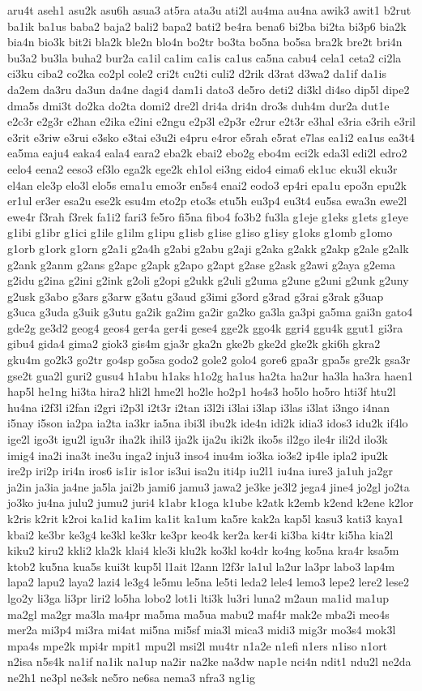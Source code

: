 {aru4t aseh1 asu2k asu6h asua3 at5ra ata3u ati2l au4ma au4na awik3 awit1 b2rut ba1ik ba1us baba2 baja2 bali2 bapa2 bati2 be4ra bena6 bi2ba bi2ta bi3p6 bia2k bia4n bio3k bit2i bla2k ble2n blo4n bo2tr bo3ta bo5na bo5sa bra2k bre2t bri4n bu3a2 bu3la buha2 bur2a ca1il ca1im ca1is ca1us ca5na cabu4 cela1 ceta2 ci2la ci3ku ciba2 co2ka co2pl cole2 cri2t cu2ti culi2 d2rik d3rat d3wa2 da1if da1is da2em da3ru da3un da4ne dagi4 dam1i dato3 de5ro deti2 di3kl di4so dip5l dipe2 dma5s dmi3t do2ka do2ta domi2 dre2l dri4a dri4n dro3s duh4m dur2a dut1e e2c3r e2g3r e2han e2ika e2ini e2ngu e2p3l e2p3r e2rur e2t3r e3hal e3ria e3rih e3ril e3rit e3riw e3rui e3sko e3tai e3u2i e4pru e4ror e5rah e5rat e7las ea1i2 ea1us ea3t4 ea5ma eaju4 eaka4 eala4 eara2 eba2k ebai2 ebo2g ebo4m eci2k eda3l edi2l edro2 eelo4 eena2 eeso3 ef3lo ega2k ege2k eh1ol ei3ng eido4 eima6 ek1uc eku3l eku3r el4an ele3p elo3l elo5s ema1u emo3r en5s4 enai2 eodo3 ep4ri epa1u epo3n epu2k er1ul er3er esa2u ese2k esu4m eto2p eto3s etu5h eu3p4 eu3t4 eu5sa ewa3n ewe2l ewe4r f3rah f3rek fa1i2 fari3 fe5ro fi5na fibo4 fo3b2 fu3la g1eje g1eks g1ets g1eye g1ibi g1ibr g1ici g1ile g1ilm g1ipu g1isb g1ise g1iso g1isy g1oks g1omb g1omo g1orb g1ork g1orn g2a1i g2a4h g2abi g2abu g2aji g2aka g2akk g2akp g2ale g2alk g2ank g2anm g2ans g2apc g2apk g2apo g2apt g2ase g2ask g2awi g2aya g2ema g2idu g2ina g2ini g2ink g2oli g2opi g2ukk g2uli g2uma g2une g2uni g2unk g2uny g2usk g3abo g3ars g3arw g3atu g3aud g3imi g3ord g3rad g3rai g3rak g3uap g3uca g3uda g3uik g3utu ga2ik ga2im ga2ir ga2ko ga3la ga3pi ga5ma gai3n gato4 gde2g ge3d2 geog4 geos4 ger4a ger4i gese4 gge2k ggo4k ggri4 ggu4k ggut1 gi3ra gibu4 gida4 gima2 giok3 gis4m gja3r gka2n gke2b gke2d gke2k gki6h gkra2 gku4m go2k3 go2tr go4sp go5sa godo2 gole2 golo4 gore6 gpa3r gpa5s gre2k gsa3r gse2t gua2l guri2 gusu4 h1abu h1aks h1o2g ha1us ha2ta ha2ur ha3la ha3ra haen1 hap5l he1ng hi3ta hira2 hli2l hme2l ho2le ho2p1 ho4s3 ho5lo ho5ro hti3f htu2l hu4na i2f3l i2fan i2gri i2p3l i2t3r i2tan i3l2i i3lai i3lap i3las i3lat i3ngo i4nan i5nay i5son ia2pa ia2ta ia3kr ia5na ibi3l ibu2k ide4n idi2k idia3 idos3 idu2k if4lo ige2l igo3t igu2l igu3r iha2k ihil3 ija2k ija2u iki2k iko5s il2go ile4r ili2d ilo3k imig4 ina2i ina3t ine3u inga2 inju3 inso4 inu4m io3ka io3s2 ip4le ipla2 ipu2k ire2p iri2p iri4n iros6 is1ir is1or is3ui isa2u iti4p iu2l1 iu4na iure3 ja1uh ja2gr ja2in ja3ia ja4ne ja5la jai2b jami6 jamu3 jawa2 je3ke je3l2 jega4 jine4 jo2gl jo2ta jo3ko ju4na julu2 jumu2 juri4 k1abr k1oga k1ube k2atk k2emb k2end k2ene k2lor k2ris k2rit k2roi ka1id ka1im ka1it ka1um ka5re kak2a kap5l kasu3 kati3 kaya1 kbai2 ke3br ke3g4 ke3kl ke3kr ke3pr keo4k ker2a ker4i ki3ba ki4tr ki5ha kia2l kiku2 kiru2 kkli2 kla2k klai4 kle3i klu2k ko3kl ko4dr ko4ng ko5na kra4r ksa5m ktob2 ku5na kua5s kui3t kup5l l1ait l2ann l2f3r la1ul la2ur la3pr labo3 lap4m lapa2 lapu2 laya2 lazi4 le3g4 le5mu le5na le5ti leda2 lele4 lemo3 lepe2 lere2 lese2 lgo2y li3ga li3pr liri2 lo5ha lobo2 lot1i lti3k lu3ri luna2 m2aun ma1id ma1up ma2gl ma2gr ma3la ma4pr ma5ma ma5ua mabu2 maf4r mak2e mba2i meo4s mer2a mi3p4 mi3ra mi4at mi5na mi5sf mia3l mica3 midi3 mig3r mo3s4 mok3l mpa4s mpe2k mpi4r mpit1 mpu2l msi2l mu4tr n1a2e n1efi n1ers n1iso n1ort n2isa n5s4k na1if na1ik na1up na2ir na2ke na3dw nap1e nci4n ndit1 ndu2l ne2da ne2h1 ne3pl ne3sk ne5ro ne6sa nema3 nfra3 ng1ig }
